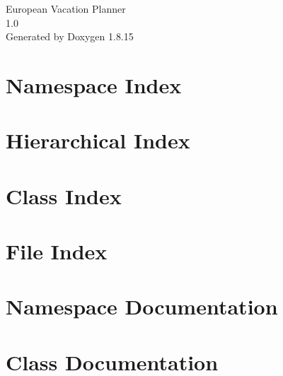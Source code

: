 \let\mypdfximage\pdfximage\def\pdfximage{\immediate\mypdfximage}\documentclass[twoside]{book}
\newcommand{\+}{\discretionary{\mbox{\scriptsize$\hookleftarrow$}}{}{}}
\newcommand{\clearemptydoublepage}{%
  \newpage{\pagestyle{empty}\cleardoublepage}%
}
\begin{document}
\hypersetup{pageanchor=false,
             bookmarksnumbered=true,
             pdfencoding=unicode
            }
\begin{titlepage}
\vspace*{7cm}
\begin{center}%
{\Large European Vacation Planner \\[1ex]\large 1.\+0 }\\
\vspace*{1cm}
{\large Generated by Doxygen 1.8.15}\\
\end{center}
\end{titlepage}
\clearemptydoublepage
{}
\tableofcontents
\clearemptydoublepage
{}
\hypersetup{pageanchor=true}

\chapter{Namespace Index}

\chapter{Hierarchical Index}

\chapter{Class Index}

\chapter{File Index}

\chapter{Namespace Documentation}

\chapter{Class Documentation}



































\end{document}
